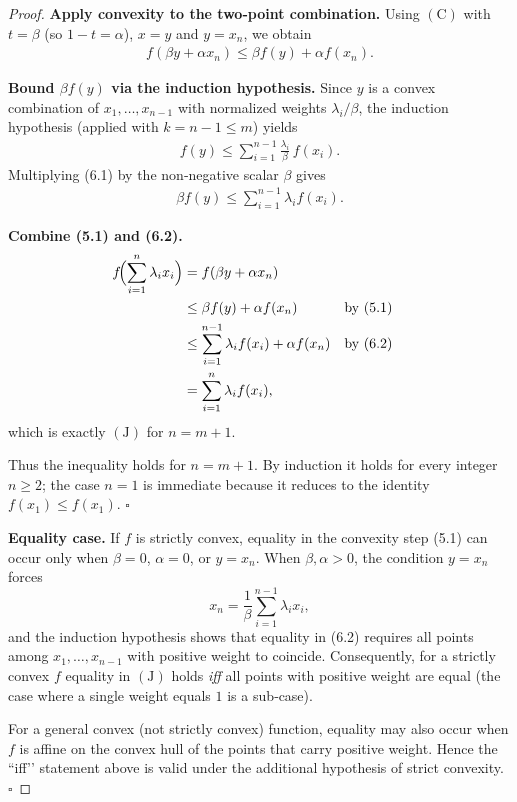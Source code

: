 \begin{proof}
\medskip\noindent\textbf{Apply convexity to the two‑point combination.}  
Using \((\mathrm{C})\) with \(t=\beta\) (so \(1-t=\alpha\)), \(x=y\) and \(y=x_{n}\), we obtain
\begin{align}
f(\beta y+\alpha x_{n})\le \beta f(y)+\alpha f(x_{n}). \tag{5.1}
\end{align}

\medskip\noindent\textbf{Bound \(\beta f(y)\) via the induction hypothesis.}  
Since \(y\) is a convex combination of \(x_{1},\dots ,x_{n-1}\) with normalized weights \(\lambda_{i}/\beta\), the induction hypothesis (applied with \(k=n-1\le m\)) yields
\begin{align}
f(y)\le \sum_{i=1}^{n-1}\frac{\lambda_{i}}{\beta}\,f(x_{i}). \tag{6.1}
\end{align}
Multiplying (6.1) by the non‑negative scalar \(\beta\) gives
\begin{align}
\beta f(y)\le \sum_{i=1}^{n-1}\lambda_{i}f(x_{i}). \tag{6.2}
\end{align}

\medskip\noindent\textbf{Combine (5.1) and (6.2).}
\begin{align*}
f\!\Bigl(\sum_{i=1}^{n}\lambda_{i}x_{i}\Bigr)
&= f(\beta y+\alpha x_{n})\\
&\le \beta f(y)+\alpha f(x_{n}) &&\text{by }(5.1)\\
&\le \sum_{i=1}^{n-1}\lambda_{i}f(x_{i})+\alpha f(x_{n}) &&\text{by }(6.2)\\
&= \sum_{i=1}^{n}\lambda_{i}f(x_{i}),
\end{align*}
which is exactly \((\mathrm{J})\) for \(n=m+1\).

Thus the inequality holds for \(n=m+1\). By induction it holds for every integer \(n\ge 2\); the case \(n=1\) is immediate because it reduces to the identity \(f(x_{1})\le f(x_{1})\). \(\square\)

\medskip\noindent\textbf{Equality case.}  
If \(f\) is strictly convex, equality in the convexity step (5.1) can occur only when \(\beta=0\), \(\alpha=0\), or \(y=x_{n}\).  
When \(\beta,\alpha>0\), the condition \(y=x_{n}\) forces
\[
x_{n}= \frac{1}{\beta}\sum_{i=1}^{n-1}\lambda_{i}x_{i},
\]
and the induction hypothesis shows that equality in (6.2) requires all points among \(x_{1},\dots ,x_{n-1}\) with positive weight to coincide. Consequently, for a strictly convex \(f\) equality in \((\mathrm{J})\) holds \emph{iff} all points with positive weight are equal (the case where a single weight equals \(1\) is a sub‑case).

For a general convex (not strictly convex) function, equality may also occur when \(f\) is affine on the convex hull of the points that carry positive weight. Hence the “iff’’ statement above is valid under the additional hypothesis of strict convexity. \(\square\)
\end{proof}